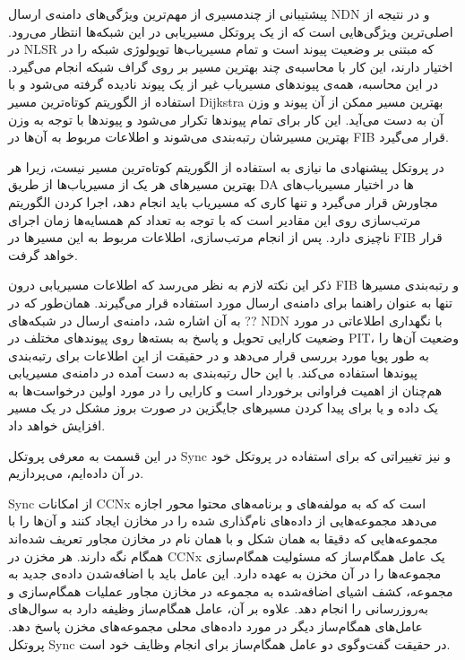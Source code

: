 \label{multipach}
پیشتیبانی از چندمسیری از مهم‌ترین ویژگی‌های دامنه‌ی ارسال NDN و در نتیجه از اصلی‌ترین ویژگی‌هایی است که از یک پروتکل مسیریابی در این شبکه‌ها انتظار می‌رود. در NLSR که مبتنی بر وضعیت پیوند است و تمام مسیریاب‌ها توپولوژی شبکه را در اختیار دارند، این کار با محاسبه‌ی چند بهترین مسیر بر روی گراف شبکه انجام می‌گیرد. در این محاسبه، همه‌ی پیوندهای مسیریاب غیر از یک پیوند نادیده گرفته می‌شود و با استفاده از الگوریتم کوتاه‌ترین مسیر Dijkstra بهترین مسیر ممکن از آن پیوند و وزن آن به دست می‌آید. این کار برای تمام پیوندها تکرار می‌شود و پیوندها با توجه به وزن بهترین مسیرشان رتبه‌بندی می‌شوند و اطلاعات مربوط به آن‌ها در FIB قرار می‌گیرد. 

در پروتکل پیشنهادی ما نیازی به استفاده از الگوریتم کوتاه‌ترین مسیر نیست، زیرا هر بهترین مسیرهای هر یک از مسیریاب‌ها از طریق DA ها در اختیار مسیریاب‌های مجاورش قرار می‌گیرد و تنها کاری که مسیریاب باید انجام دهد، اجرا کردن الگوریتم مرتب‌سازی روی این مقادیر است که با توجه به تعداد کم همسایه‌ها زمان اجرای ناچیزی دارد. پس از انجام مرتب‌سازی، اطلاعات مربوط به این مسیرها در FIB  قرار خواهد گرفت.

ذکر این نکته لازم به نظر می‌رسد که اطلاعات مسیریابی درون FIB و رتبه‌بندی مسیر‌ها تنها به عنوان راهنما برای دامنه‌ی ارسال مورد استفاده قرار می‌گیرند. همان‌طور که در ?? به آن اشاره شد، دامنه‌ی ارسال در شبکه‌های NDN با نگهداری اطلاعاتی در مورد وضعیت کارایی تحویل و پاسخ به بسته‌ها روی پیوند‌های مختلف در PIT، وضعیت آن‌ها را به طور پویا مورد بررسی قرار  می‌دهد و در حقیقت از این اطلاعات برای رتبه‌بندی پیوندها استفاده می‌کند. با این حال رتبه‌بندی به دست آمده در دامنه‌ی مسیریابی هم‌چنان از اهمیت فراوانی برخوردار است و کارایی را در مورد اولین درخواست‌ها به یک داده و یا برای پیدا کردن مسیرهای جایگزین در صورت بروز مشکل در یک مسیر افزایش خواهد داد.

\label{sync}
در این قسمت به معرفی پروتکل Sync و نیز تغییراتی که برای استفاده در پروتکل خود در آن داده‌ایم، می‌پردازیم.

Sync
 از امکانات CCNx است که که به مولفه‌های و برنامه‌های محتوا محور اجازه می‌دهد مجموعه‌هایی از داده‌های نام‌گذاری شده را در مخازن ایجاد کنند و آن‌ها را با مجموعه‌هایی که دقیقا به همان شکل و با همان نام در مخازن مجاور تعریف شده‌اند همگام نگه دارند. هر مخزن در CCNx یک عامل همگام‌ساز که مسئولیت همگام‌سازی مجموعه‌ها را در آن مخزن به عهده دارد. این عامل باید با اضافه‌شدن داده‌ی جدید به مجموعه، کشف اشیای اضافه‌شده به مجموعه در مخازن مجاور عملیات همگام‌سازی و به‌روزرسانی را انجام دهد. علاوه بر آن، عامل همگام‌ساز وظیفه دارد به سوال‌های عامل‌های همگام‌ساز دیگر 	در مورد داده‌های محلی مجموعه‌های مخزن پاسخ دهد. پروتکل Sync در حقیقت گفت‌وگوی دو عامل همگام‌ساز برای انجام وظایف خود است.

